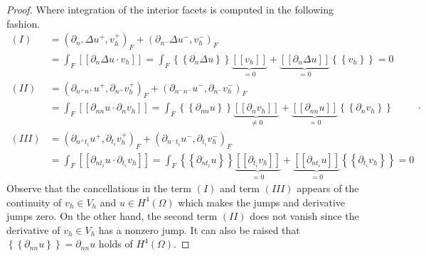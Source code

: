 \documentclass[11pt]{article}
\theoremstyle{remark}
\newcommand{\mean}[1]{\left\{\!\!\left\{#1\right\}\!\!\right\}}
\newcommand{\jump}[1]{\left[\!\left[ #1 \right]\!\right]}
\numberwithin{equation}{section}
\begin{document}
\begin{proof}
Where integration of the interior facets is computed in the following fashion.
\begin{equation}
    \label{eq:dg2_facets}
    \begin{split}
        (I) &  =    \left(\partial _{n^{+}} \Delta  u^{+} ,v_h^{+}\right)_{F} +
        \left(\partial _{n^{-}} \Delta  u^{-} ,v_h^{-}\right)_{F}  \\
            & =   \int_{F}^{}
            \jump{ \partial _{n} \Delta  u \cdot v_h } =
            \int_{F}^{}
            \mean{ \partial _{n} \Delta  u } \underbrace{\jump{ v_h }}_{= 0}    + \underbrace{\jump{ \partial _{n} \Delta  u
            }}_{= 0}    \mean{ v_h } = 0 \\
            (II) &  =     \left(\partial _{n^{+}n^{+}} u^{+}, \partial_{n^{+}} v_h^{+} \right)_{F} +  \left(\partial _{n^{-}n^{-}} u^{-}, \partial_{n^{-}} v_h^{-} \right)_{F}    \\
                 &= \int_{F}^{} \jump{ \partial _{nn} u \cdot  \partial_{n} v_h }   = \int_{F}^{}
                       \mean{ \partial _{nn} u    } \underbrace{\jump{ \partial_{n} v_h }  }_{\neq 0}    + \underbrace{\jump{ \partial
                               _{nn}  u
                       }}_{= 0}    \mean{ \partial _{n}v_h } \\
            (III) &  =     \left(\partial _{n^{+}t_{i}} u^{+}, \partial_{t_{i}} v_h^{+}
                \right)_{F} +  \left(\partial _{n^{-}t_{i}} u^{-}, \partial_{t_{i}} v_h^{-}
                \right)_{F}   \\
                 &  =   \int_{F}^{}
                 \jump{ \partial _{nt_{i}} u \cdot  \partial_{t_{i}} v_h } =
                 \int_{F}^{}
                 \mean{ \partial _{nt_{i}} u    } \underbrace{\jump{ \partial_{t_{i}} v_h }  }_{= 0}    + \underbrace{\jump{ \partial
                         _{nt_{i}}  u
                 }}_{= 0}    \mean{ \partial _{t_{i}}v_h }  = 0
                   \end{split}
.\end{equation}
Observe that the cancellations in the term $(I)$ and term $(III)$  appears of the continuity of $v_h\in V_{h} $ and $u\in H^{4}( \Omega ) $ which makes the jumps and derivative jumps zero. On the other hand, the second term $(II)$  does not vanish
since the derivative of $v_h \in V_{h}$ has a nonzero jump. It can also be raised that $\mean{
\partial _{nn} u } = \partial _{nn} u  $ holds of $H^{4}( \Omega  ) $.


\end{proof}
\end{document}
